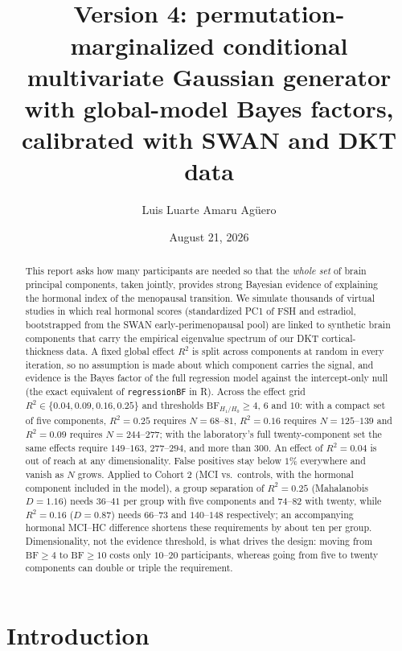 \documentclass[11pt,a4paper]{article}
\title{\vspace{-1.2em}{\color{NavyInk}\bfseries\LARGE Bayesian Sample Size Determination for\\[2pt]
``The Menopausal Transition as a Probe of Neural Vulnerability''}\\[6pt]
{\large\color{SoftGrey} Version 4: permutation-marginalized conditional multivariate Gaussian generator\\ with global-model Bayes factors, calibrated with SWAN and DKT data}}
\author{Luis Luarte \; \textperiodcentered\; Amaru Ag\"uero}
\date{August 21, 2026}
\newcommand{\BF}{\mathrm{BF}}
\begin{document}
\maketitle
\vspace{-1.4em}

\begin{abstract}
\noindent This report asks how many participants are needed so that the \emph{whole set} of brain principal components, taken jointly, provides strong Bayesian evidence of explaining the hormonal index of the menopausal transition. We simulate thousands of virtual studies in which real hormonal scores (standardized PC1 of FSH and estradiol, bootstrapped from the SWAN early-perimenopausal pool) are linked to synthetic brain components that carry the empirical eigenvalue spectrum of our DKT cortical-thickness data. A fixed global effect $R^{2}$ is split across components at random in every iteration, so no assumption is made about which component carries the signal, and evidence is the Bayes factor of the full regression model against the intercept-only null (the exact equivalent of \texttt{regressionBF} in R). Across the effect grid $R^{2}\in\{0.04,0.09,0.16,0.25\}$ and thresholds $\BF_{H_1/H_0}\ge4$, $6$ and $10$: with a compact set of five components, $R^{2}=0.25$ requires $N=68$--$81$, $R^{2}=0.16$ requires $N=125$--$139$ and $R^{2}=0.09$ requires $N=244$--$277$; with the laboratory's full twenty-component set the same effects require $149$--$163$, $277$--$294$, and more than $300$. An effect of $R^{2}=0.04$ is out of reach at any dimensionality. False positives stay below $1\%$ everywhere and vanish as $N$ grows. Applied to Cohort 2 (MCI vs.\ controls, with the hormonal component included in the model), a group separation of $R^{2}=0.25$ (Mahalanobis $D=1.16$) needs $36$--$41$ per group with five components and $74$--$82$ with twenty, while $R^{2}=0.16$ ($D=0.87$) needs $66$--$73$ and $140$--$148$ respectively; an accompanying hormonal MCI--HC difference shortens these requirements by about ten per group. Dimensionality, not the evidence threshold, is what drives the design: moving from $\BF\ge4$ to $\BF\ge10$ costs only $10$--$20$ participants, whereas going from five to twenty components can double or triple the requirement.
\end{abstract}

\section{Introduction}
\end{document}
